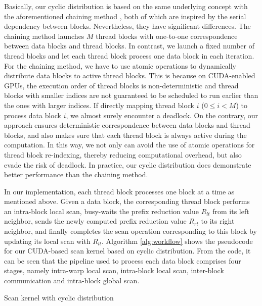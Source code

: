 \documentclass[article]{elsarticle}
\begin{document}
{Basically, our cyclic distribution is based on the same underlying concept with the aforementioned chaining method \cite{yan2013streamscan}, both of which are inspired by the serial dependency between blocks. Nevertheless, they have significant differences. The chaining method launches $M$ thread blocks with one-to-one correspondence between data blocks and thread blocks. In contrast, we launch a fixed number of thread blocks and let each thread block process one data block in each iteration. For the chaining method, we have to use atomic operations to dynamically distribute data blocks to active thread blocks. This is because on CUDA-enabled GPUs, the execution order of thread blocks is non-deterministic and thread blocks with smaller indices are not guaranteed to be scheduled to run earlier than the ones with larger indices. If directly mapping thread block $i$ (\mbox{$0\leq i < M$}) to process data block $i$, we almost surely encounter a deadlock. On the contrary, our approach ensures deterministic correspondence between data blocks and thread blocks, and also makes sure that each thread block is always active during the computation. In this way, we not only can avoid the use of atomic operations for thread block re-indexing, thereby reducing computational overhead, but also evade the risk of deadlock. In practice, our cyclic distribution does demonstrate better performance than the chaining method.

In our implementation, each thread block processes one block at a time as mentioned above. Given a data block, the corresponding thread block performs an intra-block local scan, busy-waits the prefix reduction value $R_{lt}$ from its left neighbor, sends the newly computed prefix reduction value $R_{rt}$ to its right neighbor, and finally completes the scan operation corresponding to this block by updating its local scan with $R_{lt}$. Algorithm \ref{alg:workflow} shows the pseudocode for our CUDA-based scan kernel based on cyclic distribution. From the code, it can be seen that the pipeline used to process each data block comprises four stages, namely intra-warp local scan, intra-block local scan, inter-block communication and intra-block global scan.
\begin{algorithm}[!h]
\caption{Scan kernel with cyclic distribution}
\label{alg:workflow}
\begin{algorithmic}[1]
\fontsize{8pt}{8.05pt}\selectfont
{}
    

\end{algorithmic}
\end{algorithm}}
\end{document}
